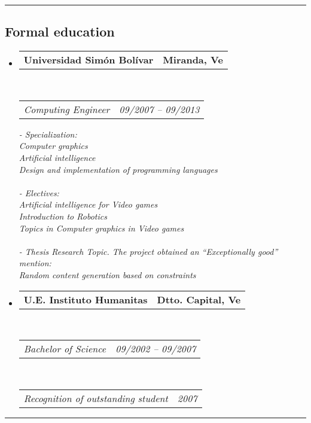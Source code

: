 \documentclass[10pt,letterpaper]{article}
\makeatletter
\newcommand{\headerrow}[2]
{\begin{tabular*}{\linewidth}{l@{\extracolsep{\fill}}r}
	#1 &
	#2 \\
\end{tabular*}}
\makeatother
\begin{document}

\hrule
\vspace{-0.4em}
\subsection*{Formal education}

\begin{itemize}
	\parskip=0.1em

\item 
   \headerrow
   {\textbf{Universidad Simón Bolívar}}
   {\textbf{Miranda, Ve}}
	\\
	\headerrow
   {\emph{Computing Engineer}}
   {\emph{09/2007 -- 09/2013}}
   
   
   {\emph{- Specialization:}}
   \\
   {\emph{     Computer graphics}}
   \\
   {\emph{     Artificial intelligence}}
   \\
   {\emph{     Design and implementation of programming languages}}
   \\
   \\
   {\emph{- Electives:}}
   \\
   {\emph{     Artificial intelligence for Video games}}
   \\
   {\emph{     Introduction to Robotics}}
   \\
   {\emph{     Topics in Computer graphics in Video games}}
   \\
   \\
   {\emph{- Thesis Research Topic. The project obtained an “Exceptionally good” mention:}}
   \\
   {\emph{     Random content generation based on constraints}}

 \item 
   \headerrow
   {\textbf{U.E. Instituto Humanitas}}
   {\textbf{Dtto. Capital, Ve}}
	\\
	\headerrow
   {\emph{Bachelor of Science}}
   {\emph{09/2002 -- 09/2007}}
	\\
	\headerrow
   {\emph{Recognition of outstanding student}}
   {\emph{2007}}
\end{itemize}

\hrule
\vspace{-0.4em}
\end{document}
